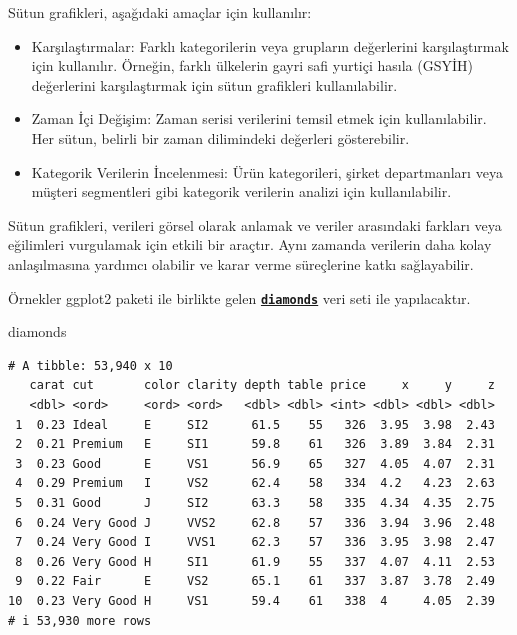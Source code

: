 \documentclass[
  letterpaper,
  DIV=11,
  numbers=noendperiod]{scrreprt}
\newenvironment{Shaded}{\begin{snugshade}}{\end{snugshade}}
\newcommand{\NormalTok}[1]{\textcolor[rgb]{0.00,0.23,0.31}{#1}}
\begin{document}
Sütun grafikleri, aşağıdaki amaçlar için kullanılır:

\begin{itemize}
\item
  Karşılaştırmalar: Farklı kategorilerin veya grupların değerlerini
  karşılaştırmak için kullanılır. Örneğin, farklı ülkelerin gayri safi
  yurtiçi hasıla (GSYİH) değerlerini karşılaştırmak için sütun
  grafikleri kullanılabilir.
\item
  Zaman İçi Değişim: Zaman serisi verilerini temsil etmek için
  kullanılabilir. Her sütun, belirli bir zaman dilimindeki değerleri
  gösterebilir.
\item
  Kategorik Verilerin İncelenmesi: Ürün kategorileri, şirket
  departmanları veya müşteri segmentleri gibi kategorik verilerin
  analizi için kullanılabilir.
\end{itemize}

Sütun grafikleri, verileri görsel olarak anlamak ve veriler arasındaki
farkları veya eğilimleri vurgulamak için etkili bir araçtır. Aynı
zamanda verilerin daha kolay anlaşılmasına yardımcı olabilir ve karar
verme süreçlerine katkı sağlayabilir.

Örnekler ggplot2 paketi ile birlikte gelen
\href{https://ggplot2.tidyverse.org/reference/diamonds.html}{\textbf{\texttt{diamonds}}}
veri seti ile yapılacaktır.

\begin{Shaded}
\begin{Highlighting}[]
\NormalTok{diamonds}
\end{Highlighting}
\end{Shaded}

\begin{verbatim}
# A tibble: 53,940 x 10
   carat cut       color clarity depth table price     x     y     z
   <dbl> <ord>     <ord> <ord>   <dbl> <dbl> <int> <dbl> <dbl> <dbl>
 1  0.23 Ideal     E     SI2      61.5    55   326  3.95  3.98  2.43
 2  0.21 Premium   E     SI1      59.8    61   326  3.89  3.84  2.31
 3  0.23 Good      E     VS1      56.9    65   327  4.05  4.07  2.31
 4  0.29 Premium   I     VS2      62.4    58   334  4.2   4.23  2.63
 5  0.31 Good      J     SI2      63.3    58   335  4.34  4.35  2.75
 6  0.24 Very Good J     VVS2     62.8    57   336  3.94  3.96  2.48
 7  0.24 Very Good I     VVS1     62.3    57   336  3.95  3.98  2.47
 8  0.26 Very Good H     SI1      61.9    55   337  4.07  4.11  2.53
 9  0.22 Fair      E     VS2      65.1    61   337  3.87  3.78  2.49
10  0.23 Very Good H     VS1      59.4    61   338  4     4.05  2.39
# i 53,930 more rows
\end{verbatim}
\end{document}
